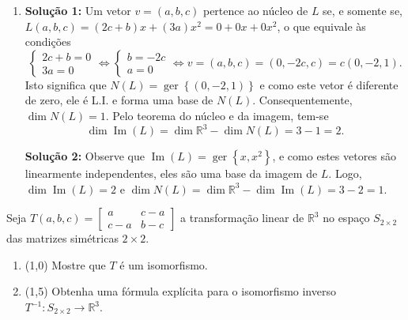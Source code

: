 \documentclass[12pt,a4paper]{article}
\newcommand*\im[1]{\operatorname{Im}\left(#1\right)}
\newcommand*\ger[1]{\operatorname{ger}\left\{#1\right\}}
\newcommand*\R{\mathbb{R}}
\begin{document}
\begin{ExerciseList}
\begin{enumerate}
\item \textbf{Solução 1:} Um vetor $v = (a,b,c)$ pertence ao núcleo de $L$ se, e somente se, $L(a,b,c) = (2c+b)x + (3a)x^2 = 0 + 0x + 0x^2$, o que equivale às condições
\[
\begin{cases}
2c+b=0\\
3a=0
\end{cases}
\Leftrightarrow
\begin{cases}
b=-2c\\
a=0
\end{cases}
\Leftrightarrow
v = (a,b,c) = (0,-2c,c) = c(0,-2,1).
\]
Isto significa que $N(L) = \ger{(0,-2,1)}$ e como este vetor é diferente de zero, ele é L.I. e forma uma base de $N(L)$. Consequentemente, $\dim{N(L)} = 1$. Pelo teorema do núcleo e da imagem, tem-se
\[
\dim{\im{L}} = \dim{\R^3} - \dim{N(L)} = 3 - 1 = 2.
\]

\textbf{Solução 2:} Observe que $\im{L} = \ger{x,x^2}$, e como estes vetores são linearmente independentes, eles são uma base da imagem de $L$. Logo, $\dim{\im{L}} = 2$ e $\dim{N(L)} = \dim{\R^3} - \dim{\im{L}} = 3 - 2 = 1$.

\end{enumerate}

\Exercise[title={2,5}] Seja $T(a,b,c) = \begin{bmatrix}
  a & c-a\\
c-a & b-c
\end{bmatrix}$ a transformação linear de $\R^3$ no espaço $S_{2\times 2}$ das matrizes simétricas $2 \times 2$.
\begin{enumerate}
\item (1,0) Mostre que $T$ é um isomorfismo.
\item (1,5) Obtenha uma fórmula explícita para o isomorfismo inverso $T^{-1}: S_{2 \times 2} \to \R^3$.
\end{enumerate}


\end{ExerciseList}
\end{document}
